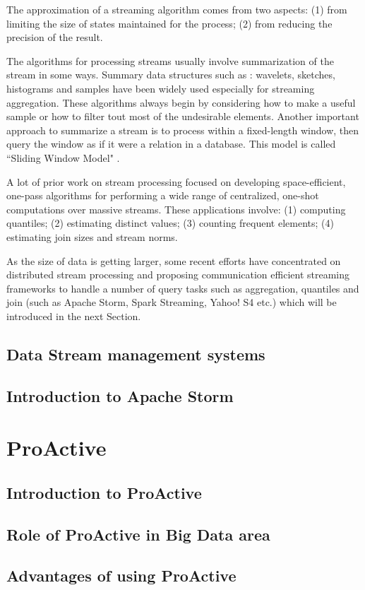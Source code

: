 \documentclass[	DIV=calc,%
							paper=a4,%
							fontsize=11pt,%
							twocolumn]{scrartcl}	 					%
\begin{document}
The approximation of a streaming algorithm comes from two aspects: (1) from limiting the size of states maintained for the process; (2) from reducing the precision of the result. 

The algorithms for processing streams usually involve summarization of the stream in some ways. Summary data structures such as : wavelets, sketches, histograms and samples have been widely used especially  for streaming aggregation. These algorithms always begin by considering how to make a useful sample or how to filter tout most of the undesirable elements. Another important approach to summarize a stream is to process within a fixed-length window, then query the window as if it were a relation in a database. This model is called ``Sliding Window Model" \cite{SlidingWindow}.


A lot of prior work on stream processing focused on developing space-efficient, one-pass algorithms for performing a wide range of centralized, one-shot computations over massive streams. These applications involve: (1) computing quantiles; (2) estimating distinct values; (3) counting frequent elements; (4) estimating join sizes and stream norms.

As the size of data is getting larger, some recent efforts have concentrated on distributed stream processing and proposing communication efficient streaming frameworks to handle a number of query tasks such as aggregation, quantiles and join (such as Apache Storm, Spark Streaming, Yahoo! S4 etc.) which will be introduced in the next Section.  


\subsection*{Data Stream management systems}



\subsection*{Introduction to Apache Storm}

\section*{\color{DarkOrange} ProActive}

\subsection*{Introduction to ProActive}

\subsection*{Role of ProActive in Big Data area}

\subsection*{Advantages of using ProActive}



\end{document}
